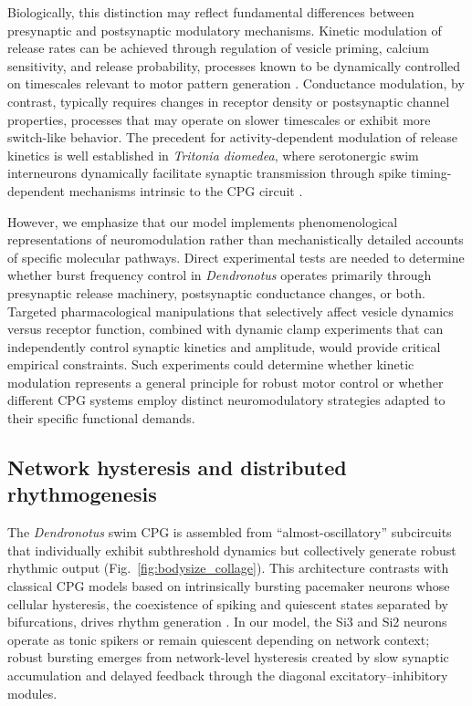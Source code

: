 \documentclass[nofootinbib,aip,amsmath,amssymb,preprint,twocolumn,floatfix,10pt]{revtex4-2}
\begin{document}
Biologically, this distinction may reflect fundamental differences between presynaptic and postsynaptic modulatory mechanisms. Kinetic modulation of release rates can be achieved through regulation of vesicle priming, calcium sensitivity, and release probability, processes known to be dynamically controlled on timescales relevant to motor pattern generation \cite{NeherBrose2018, jackman2017mechanisms}. Conductance modulation, by contrast, typically requires changes in receptor density or postsynaptic channel properties, processes that may operate on slower timescales or exhibit more switch-like behavior. The precedent for activity-dependent modulation of release kinetics is well established in \textit{Tritonia diomedea}, where serotonergic swim interneurons dynamically facilitate synaptic transmission through spike timing-dependent mechanisms intrinsic to the CPG circuit \cite{katz1994dynamic, sakurai2003spike}.

However, we emphasize that our model implements phenomenological representations of neuromodulation rather than mechanistically detailed accounts of specific molecular pathways. Direct experimental tests are needed to determine whether burst frequency control in \textit{Dendronotus} operates primarily through presynaptic release machinery, postsynaptic conductance changes, or both. Targeted pharmacological manipulations that selectively affect vesicle dynamics versus receptor function, combined with dynamic clamp experiments that can independently control synaptic kinetics and amplitude, would provide critical empirical constraints. Such experiments could determine whether kinetic modulation represents a general principle for robust motor control or whether different CPG systems employ distinct neuromodulatory strategies adapted to their specific functional demands.

\subsection{Network hysteresis and distributed rhythmogenesis}

The \textit{Dendronotus} swim CPG is assembled from ``almost-oscillatory'' subcircuits that individually exhibit subthreshold dynamics but collectively generate robust rhythmic output (Fig.~\ref{fig:bodysize_collage}). This architecture contrasts with classical CPG models based on intrinsically bursting pacemaker neurons whose cellular hysteresis, the coexistence of spiking and quiescent states separated by bifurcations, drives rhythm generation \cite{plant81, Rinzel87b, RL87}. In our model, the Si3 and Si2 neurons operate as tonic spikers or remain quiescent depending on network context; robust bursting emerges from network-level hysteresis created by slow synaptic accumulation and delayed feedback through the diagonal excitatory--inhibitory modules.
\end{document}
